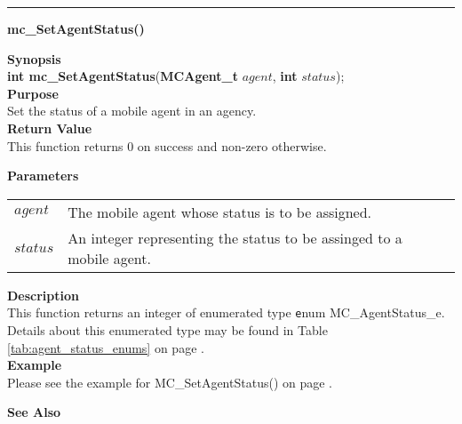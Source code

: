 \noindent
\vspace{5pt}
\rule{6.5in}{0.015in}
\noindent
{\LARGE \bf mc\_SetAgentStatus()}\\
{}

\noindent
{\bf Synopsis}\\
{\bf int mc\_SetAgentStatus}({\bf MCAgent\_t} $agent$, {\bf int} $status$);\\

\noindent
{\bf Purpose}\\
Set the status of a mobile agent in an agency.\\

\noindent
{\bf Return Value}\\
This function returns 0 on success and non-zero otherwise.

\noindent
{\bf Parameters}
\vspace{-0.1in}
\begin{description}
\item
\begin{tabular}{p{10 mm}p{145 mm}}
$agent$ & The mobile agent whose status is to be assigned.\\
$status$ & An integer representing the status to be assinged to a mobile agent.
\end{tabular}
\end{description}

\noindent
{\bf Description}\\
This function returns an integer of enumerated type
{\texttt enum MC\_AgentStatus\_e}. Details about this enumerated type may be
found in Table \ref{tab:agent_status_enums} on page \pageref{tab:agent_status_enums}.\\

\noindent
{\bf Example}\\
Please see the example for MC\_SetAgentStatus() on page
\pageref{api:MC_SetAgentStatus()}.\\
\noindent

\noindent
{\bf See Also}\\

